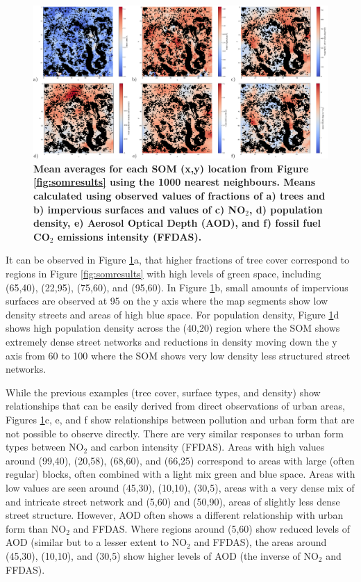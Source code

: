 \documentclass[9pt,twocolumn,twoside,lineno]{pnas-new}
\begin{document}
\begin{figure}
\centering
\includegraphics[trim={0 0 0 0},clip,scale=0.14]{BlockTypologies_Figures4-0.png}
\caption{\bf Mean averages for each SOM (x,y) location from Figure \ref{fig:somresults} using the 1000 nearest neighbours. Means calculated using observed values of fractions of a) trees and b) impervious surfaces and values of c) NO$_{2}$, d) population density, e) Aerosol Optical Depth (AOD), and f) fossil fuel CO$_{2}$ emissions intensity (FFDAS).}
 \label{fig:meansomresults}
\end{figure} 

It can be observed in Figure \ref{fig:meansomresults}a, that higher fractions of tree cover correspond to regions in Figure \ref{fig:somresults} with high levels of green space, including (65,40), (22,95), (75,60), and (95,60). In Figure \ref{fig:meansomresults}b, small amounts of impervious surfaces are observed at 95 on the y axis where the map segments show low density streets and areas of high blue space. For population density, Figure \ref{fig:meansomresults}d shows high population density across the (40,20) region where the SOM shows extremely dense street networks and reductions in density moving down the y axis from 60 to 100 where the SOM shows very low density less structured street networks.

While the previous examples (tree cover, surface types, and density) show relationships that can be easily derived from direct observations of urban areas, Figures \ref{fig:meansomresults}c, e, and f show relationships between pollution and urban form that are not possible to observe directly. There are very similar responses to urban form types between NO$_{2}$ and carbon intensity (FFDAS). Areas with high values around (99,40), (20,58), (68,60), and (66,25) correspond to areas with large (often regular) blocks, often combined with a light mix green and blue space. Areas with low values are seen around (45,30), (10,10), (30,5), areas with a very dense mix of and intricate street network and (5,60) and (50,90), areas of slightly less dense street structure. However, AOD often shows a different relationship with urban form than NO$_{2}$ and FFDAS. Where regions around (5,60) show reduced levels of AOD (similar but to a lesser extent to NO$_{2}$ and FFDAS), the areas around (45,30), (10,10), and (30,5) show higher levels of AOD (the inverse of NO$_{2}$ and FFDAS). 
\end{document}
